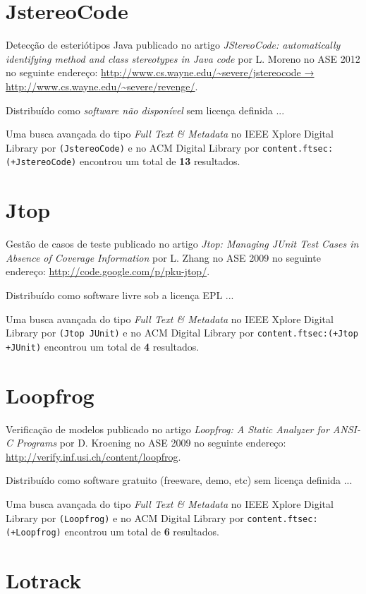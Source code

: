 \section{JstereoCode}

Detecção de esteriótipos Java
publicado no artigo
{\it JStereoCode: automatically identifying method and class stereotypes in Java code}
por
L. Moreno
no
ASE
2012
no seguinte endereço:
\url{http://www.cs.wayne.edu/~severe/jstereocode → http://www.cs.wayne.edu/~severe/revenge/}.

Distribuído como {\it software não disponível}
sem licença definida ...


Uma busca avançada do tipo {\it Full Text \& Metadata} no IEEE Xplore Digital Library por
\texttt{(JstereoCode)}
e no ACM Digital Library por
\texttt{content.ftsec:(+JstereoCode)}
encontrou um total de
{\bf 13}
resultados.

\section{Jtop}

Gestão de casos de teste
publicado no artigo
{\it Jtop: Managing JUnit Test Cases in Absence of Coverage Information}
por
L. Zhang
no
ASE
2009
no seguinte endereço:
\url{http://code.google.com/p/pku-jtop/}.

Distribuído como software livre
sob a licença EPL ...


Uma busca avançada do tipo {\it Full Text \& Metadata} no IEEE Xplore Digital Library por
\texttt{(Jtop JUnit)}
e no ACM Digital Library por
\texttt{content.ftsec:(+Jtop +JUnit)}
encontrou um total de
{\bf 4}
resultados.

\section{Loopfrog}

Verificação de modelos
publicado no artigo
{\it Loopfrog: A Static Analyzer for ANSI-C Programs}
por
D. Kroening
no
ASE
2009
no seguinte endereço:
\url{http://verify.inf.usi.ch/content/loopfrog}.

Distribuído como software gratuito (freeware, demo, etc)
sem licença definida ...


Uma busca avançada do tipo {\it Full Text \& Metadata} no IEEE Xplore Digital Library por
\texttt{(Loopfrog)}
e no ACM Digital Library por
\texttt{content.ftsec:(+Loopfrog)}
encontrou um total de
{\bf 6}
resultados.

\section{Lotrack}


